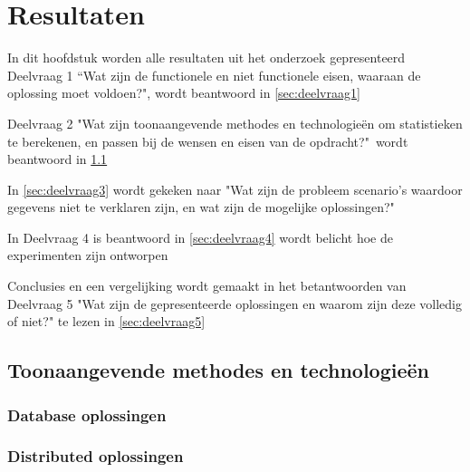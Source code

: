 \chapter{Resultaten}

In dit hoofdstuk worden alle resultaten uit het onderzoek gepresenteerd
Deelvraag 1 ``Wat zijn de functionele en niet functionele eisen, waaraan de oplossing moet voldoen?", wordt beantwoord in \ref{sec:deelvraag1}

Deelvraag 2 "Wat zijn toonaangevende methodes en technologieën om statistieken te berekenen, en passen bij de wensen en eisen van de opdracht?"\  wordt beantwoord in \ref{sec:deelvraag2}

In \ref{sec:deelvraag3} wordt gekeken naar "Wat zijn de probleem scenario's waardoor gegevens niet te verklaren zijn, en wat zijn de mogelijke oplossingen?"\

In Deelvraag 4 is beantwoord in \ref{sec:deelvraag4} wordt belicht hoe de experimenten zijn ontworpen

Conclusies en een vergelijking wordt gemaakt in het betantwoorden van Deelvraag 5 "Wat zijn de gepresenteerde oplossingen en waarom zijn deze volledig of niet?" te lezen in \ref{sec:deelvraag5}


\clearpage



\clearpage

\section{Toonaangevende methodes en technologieën}
\label{sec:deelvraag2}


\newpage

\subsection{Database oplossingen}
\label{sec:databases}

\clearpage

\subsection{Distributed oplossingen}
\label{sec:distributed}

\clearpage

